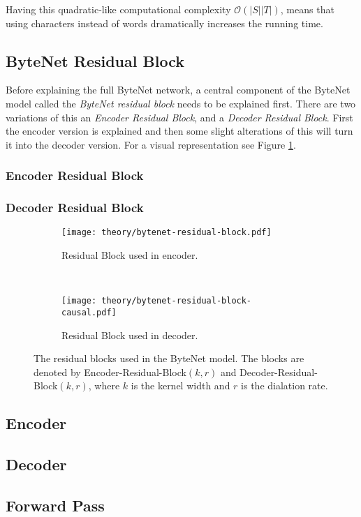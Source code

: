 Having this quadratic-like computational complexity $\mathcal{O}(|S||T|)$, means that using characters instead of words dramatically increases the running time.

\subsection{ByteNet Residual Block}

Before explaining the full ByteNet network, a central component of the ByteNet model called the \textit{ByteNet residual block} needs to be explained first. There are two variations of this an \textit{Encoder Residual Block}, and a \textit{Decoder Residual Block}. First the encoder version is explained and then some slight alterations of this will turn it into the decoder version. For a visual representation see Figure \ref{fig:bytenet:residual-block}.

\subsubsection{Encoder Residual Block}

\subsubsection{Decoder Residual Block}

\begin{figure}[h]
    \centering
    \begin{subfigure}[b]{0.45\textwidth}
        \centering
        \texttt{[image: theory/bytenet-residual-block.pdf]}
        \caption{Residual Block used in encoder.}
    \end{subfigure}
    ~ %
    \begin{subfigure}[b]{0.45\textwidth}
        \centering
        \texttt{[image: theory/bytenet-residual-block-causal.pdf]}
        \caption{Residual Block used in decoder.}
    \end{subfigure}
    \caption{The residual blocks used in the ByteNet model. The blocks are denoted by Encoder-Residual-Block$(k,r)$ and Decoder-Residual-Block$(k,r)$, where $k$ is the kernel width and $r$ is the dialation rate.}
    \label{fig:bytenet:residual-block}
\end{figure}



\FloatBarrier
\subsection{Encoder}
\subsection{Decoder}
\subsection{Forward Pass}
